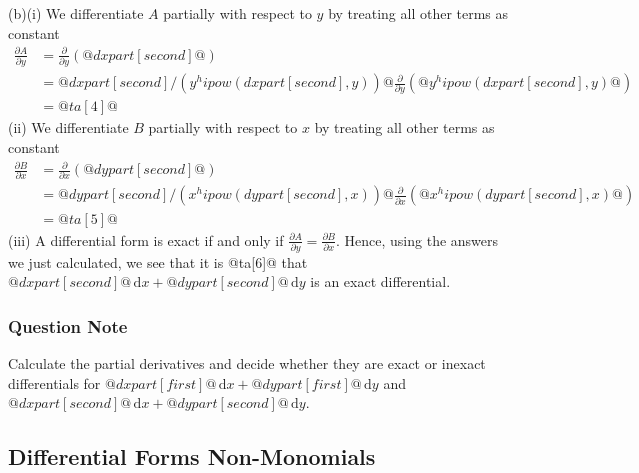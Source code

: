 \documentclass[a4paper,10pt]{article}
\begin{document}
(b)(i) We differentiate \(A\) partially with respect to \(y\) by treating all other terms as constant \begin{align*} \frac{\partial A}{\partial y} &= \frac{\partial}{\partial y} \left( @dxpart[second]@ \right) \\ &= @dxpart[second]/(y^hipow(dxpart[second],y))@ \frac{\partial}{\partial y} \left( @y^hipow(dxpart[second],y)@ \right) \\ &= @ta[4]@ \end{align*}(ii) We differentiate \(B\) partially with respect to \(x\) by treating all other terms as constant \begin{align*} \frac{\partial B}{\partial x} &= \frac{\partial}{\partial x} \left( @dypart[second]@ \right) \\ &= @dypart[second]/(x^hipow(dypart[second],x))@ \frac{\partial}{\partial x} \left( @x^hipow(dypart[second],x)@ \right) \\ &= @ta[5]@ \end{align*}(iii) A differential form is exact if and only if \(\frac{\partial A}{\partial y} = \frac{\partial B}{\partial x}\). Hence, using the answers we just calculated, we see that it is @ta[6]@ that \(@dxpart[second]@ \, \text{d}x + @dypart[second]@ \, \text{d}y\) is an exact differential.
\subsubsection{Question Note}
Calculate the partial derivatives and decide whether they are exact or inexact differentials for \(@dxpart[first]@ \, \text{d}x + @dypart[first]@ \, \text{d}y\)  and \(@dxpart[second]@ \, \text{d}x + @dypart[second]@ \, \text{d}y\).

\subsection{Differential Forms Non-Monomials}
\end{document}
